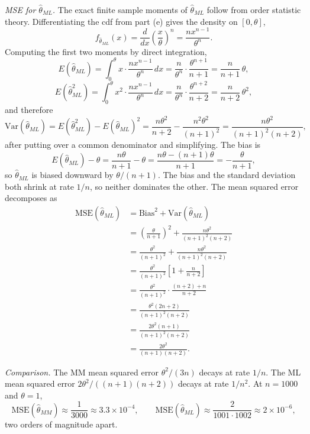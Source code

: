 \textit{MSE for $\widehat\theta_{ML}$.} The exact finite sample moments of $\widehat\theta_{ML}$ follow from order statistic theory. Differentiating the cdf from part (e) gives the density on $[0, \theta]$,
\[
f_{\widehat\theta_{ML}}(x) = \frac{d}{dx}\left(\frac{x}{\theta}\right)^n = \frac{n x^{n-1}}{\theta^n}.
\]
Computing the first two moments by direct integration,
\[
E(\widehat\theta_{ML}) = \int_0^\theta x \cdot \frac{n x^{n-1}}{\theta^n}\, dx = \frac{n}{\theta^n} \cdot \frac{\theta^{n+1}}{n+1} = \frac{n}{n+1}\, \theta,
\]
\[
E(\widehat\theta_{ML}^2) = \int_0^\theta x^2 \cdot \frac{n x^{n-1}}{\theta^n}\, dx = \frac{n}{\theta^n} \cdot \frac{\theta^{n+2}}{n+2} = \frac{n}{n+2}\, \theta^2,
\]
and therefore
\[
\mathrm{Var}(\widehat\theta_{ML}) = E(\widehat\theta_{ML}^2) - E(\widehat\theta_{ML})^2 = \frac{n \theta^2}{n+2} - \frac{n^2 \theta^2}{(n+1)^2} = \frac{n \theta^2}{(n+1)^2 (n+2)},
\]
after putting over a common denominator and simplifying. The bias is
\[
E(\widehat\theta_{ML}) - \theta = \frac{n \theta}{n+1} - \theta = \frac{n \theta - (n+1) \theta}{n+1} = -\frac{\theta}{n+1},
\]
so $\widehat\theta_{ML}$ is biased downward by $\theta/(n+1)$. The bias and the standard deviation both shrink at rate $1/n$, so neither dominates the other. The mean squared error decomposes as
\begin{align*}
\mathrm{MSE}(\widehat\theta_{ML})
&= \mathrm{Bias}^2 + \mathrm{Var}(\widehat\theta_{ML}) \\
&= \left(\frac{\theta}{n+1}\right)^2 + \frac{n \theta^2}{(n+1)^2 (n+2)} \\
&= \frac{\theta^2}{(n+1)^2} + \frac{n \theta^2}{(n+1)^2 (n+2)} \\
&= \frac{\theta^2}{(n+1)^2} \left[1 + \frac{n}{n+2}\right] \\
&= \frac{\theta^2}{(n+1)^2} \cdot \frac{(n+2) + n}{n+2} \\
&= \frac{\theta^2 (2 n + 2)}{(n+1)^2 (n+2)} \\
&= \frac{2 \theta^2 (n+1)}{(n+1)^2 (n+2)} \\
&= \frac{2 \theta^2}{(n+1)(n+2)}.
\end{align*}

\textit{Comparison.} The MM mean squared error $\theta^2/(3n)$ decays at rate $1/n$. The ML mean squared error $2 \theta^2 / ((n+1)(n+2))$ decays at rate $1/n^2$. At $n = 1000$ and $\theta = 1$,
\[
\mathrm{MSE}(\widehat\theta_{MM}) \approx \frac{1}{3000} \approx 3.3 \times 10^{-4}, \qquad
\mathrm{MSE}(\widehat\theta_{ML}) \approx \frac{2}{1001 \cdot 1002} \approx 2 \times 10^{-6},
\]
two orders of magnitude apart.

